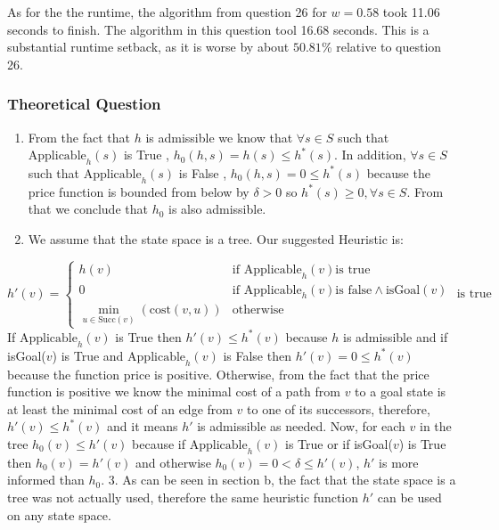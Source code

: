 \documentclass[11pt]{article}
\providecommand{\tightlist}{%
      \setlength{\itemsep}{0pt}\setlength{\parskip}{0pt}}
\begin{document}
As for the the runtime, the algorithm from question 26 for \(w=0.58\)
took 11.06 seconds to finish. The algorithm in this question tool 16.68
seconds. This is a substantial runtime setback, as it is worse by about
\(50.81\)\% relative to question 26.

    \subsubsection{Theoretical Question}\label{theoretical-question}

\begin{enumerate}
\def\labelenumi{\arabic{enumi}.}
\tightlist
\item
  From the fact that \(h\) is admissible we know that \(\forall s\in S\)
  such that \(\text{Applicable}_h (s)\) is True ,
  \(h_0(h,s)=h(s)\leq h^*(s)\). In addition, \(\forall s\in S\) such
  that \(\text{Applicable}_h (s)\) is False , \(h_0(h,s)=0 \leq h^*(s)\)
  because the price function is bounded from below by \(\delta>0\) so
  \(h^*(s)\geq 0, \forall s\in S\). From that we conclude that \(h_0\)
  is also admissible.
\item
  We assume that the state space is a tree. Our suggested Heuristic is:
\end{enumerate}

\[h'\left(v\right)=\begin{cases}
h\left(v\right) & \text{if Applicable}_{h}\left(v\right)\text{is true}\\
0 & \text{if Applicable}_{h}\left(v\right)\text{is false} \land  \text{isGoal}\left(v\right)\\
\min_{u\in\text{Succ}\left(v\right)}\left(\text{cost}\left(v,u\right)\right) & \text{otherwise}
\end{cases}\text{ is true }\] If \(\text{Applicable}_h (v)\) is True
then \(h'(v) \leq h^*(v)\) because \(h\) is admissible and if
isGoal(\(v\)) is True and \(\text{Applicable}_h(v)\) is False then
\(h'(v) = 0 \leq h^*(v)\) because the function price is positive.
Otherwise, from the fact that the price function is positive we know the
minimal cost of a path from \(v\) to a goal state is at least the
minimal cost of an edge from \(v\) to one of its successors, therefore,
\(h'(v) \leq h^*(v)\) and it means \(h'\) is admissible as needed. Now,
for each \(v\) in the tree \(h_0(v) \leq h'(v)\) because if
\(\text{Applicable}_h (v)\) is True or if isGoal(\(v\)) is True then
\(h_0(v) = h'(v)\) and otherwise \(h_0(v) = 0 < \delta \leq h'(v)\),
\(h'\) is more informed than \(h_0\). 3. As can be seen in section b,
the fact that the state space is a tree was not actually used, therefore
the same heuristic function \(h'\) can be used on any state space.
\end{document}
